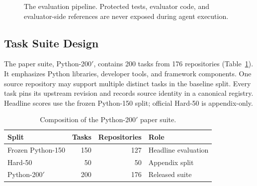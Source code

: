 \begin{figure}[t]
  \centering
  \caption{The \flb evaluation pipeline. Protected tests, evaluator code, and
  evaluator-side references are never exposed during agent execution.}
  \label{fig:pipeline}
\end{figure}

\subsection{Task Suite Design}

The paper suite, Python-200$'$, contains 200 tasks from 176 repositories
(Table~\ref{tab:suite}). It emphasizes Python libraries, developer tools, and
framework components. One source repository may support multiple distinct
tasks in the baseline split. Every task pins its upstream revision and records
source identity in a canonical registry. Headline scores use the frozen
Python-150 split; official Hard-50 is appendix-only.

\begin{table}[t]
  \caption{Composition of the Python-200$'$ paper suite.}
  \label{tab:suite}
  \centering
  \begin{tabular}{lrrl}
    \toprule
    \textbf{Split} & \textbf{Tasks} & \textbf{Repositories} & \textbf{Role} \\
    \midrule
    Frozen Python-150 & 150 & 127 & Headline evaluation \\
    Hard-50 & 50 & 50 & Appendix split \\
    \midrule
    Python-200$'$ & 200 & 176 & Released suite \\
    \bottomrule
  \end{tabular}
\end{table}

